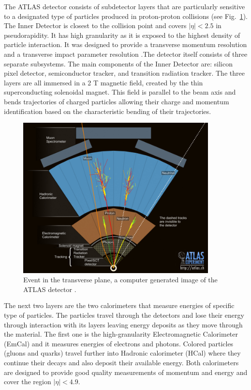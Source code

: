 The ATLAS detector consists of subdetector layers that are particularly sensitive to a designated type of particles produced in proton-proton collisions (see Fig.~\ref{fig:event}). The Inner Detector is closest to the collision point and covers $|\eta|<2.5$ in pseudorapidity. It has high granularity as it is exposed to the highest density of particle interaction. It was designed to provide a transverse momentum resolution and a transverse impact parameter resolution \citep{aad2010atlas}.The detector itself consists of three separate subsystems. The main components of the Inner Detector are: silicon pixel detector, semiconductor tracker, and transition radiation tracker. The three layers are all immersed in a 2 T magnetic field, created by the thin superconducting solenoidal magnet. This field is parallel to the beam axis and bends trajectories of charged particles allowing their charge and momentum identification based on the characteristic bending of their trajectories. 
\begin{figure}[!h]
	\centering
    \captionsetup{width=\textwidth}
	\includegraphics[width=0.9\textwidth]{Chap2/0803022_01.jpg}
\caption{\label{fig:event} Event in the transverse plane, a computer generated image of the ATLAS detector \cite{event}. }
\end{figure}

The next two layers are the two calorimeters that measure energies of specific type of particles. The particles travel through the detectors and lose their energy through interaction with its layers leaving energy deposits as they move through the material. 
The first one is the high-granularity Electromagnetic Calorimeter (EmCal) and it measures energies of electrons and photons. Colored particles (gluons and quarks) travel further into Hadronic calorimeter (HCal) where they continue their decays and also deposit their available energy. 
Both calorimeters are  designed to provide good quality measurements of momentum and energy and cover the region $|\eta|<4.9$.

